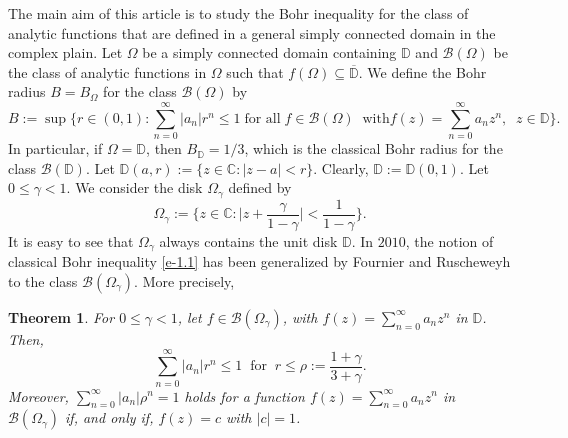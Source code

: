 \documentclass[a4paper,12pt]{amsart}
\theoremstyle{plain}
\newtheorem{thm}[equation]{Theorem}
\theoremstyle{definition}
\begin{document}
The main aim of this article is to study the Bohr inequality for the class of analytic functions that are defined in a general simply connected domain in the complex plain. Let $\Omega$ be a simply connected domain containing $\mathbb{D}$ and $\mathcal{B}(\Omega)$ be the class of analytic functions in $\Omega$ such that $f(\Omega) \subseteq \overline{\mathbb{D}}$. We define the Bohr radius $B=B_{\Omega}$ for the class $\mathcal{B}(\Omega)$ by 
\begin{equation*}
	B:=\sup\bigg\{r\in (0,1) : \sum_{n=0}^{\infty}|a_n|r^n\leq 1\; \text{for all}\; f\in\mathcal{B}(\Omega)\;\; \mbox{with} f(z)=\sum_{n=0}^{\infty}a_nz^n, \;\; z\in\mathbb{D}\bigg\}.
\end{equation*}
In particular, if $ \Omega=\mathbb{D} $, then $ B_{\mathbb{D}}=1/3 $, which is the classical Bohr radius for the class $\mathcal{B}(\mathbb{D})$. Let $\mathbb{D}(a,r):=\{z\in \mathbb{C}: |z-a|<r\}$. Clearly, $\mathbb{D}:=\mathbb{D}(0,1)$. Let $0\leq \gamma <1$. We consider the disk $\Omega _{\gamma}$ defined by 
$$
\Omega_{\gamma}:=\bigg\{z\in\mathbb{C} : \bigg|z+\frac{\gamma}{1-\gamma}\bigg|<\frac{1}{1-\gamma}\bigg\}.
$$
It is easy to see that $\Omega _{\gamma}$ always contains the unit disk $\mathbb{D}$.
In $ 2010 $, the notion of classical Bohr inequality \eqref{e-1.1} has been generalized by Fournier and Ruscheweyh \cite{Four-Rusc-2010} to the class $\mathcal{B}(\Omega_{\gamma})$. More precisely,
\begin{thm}\cite{Four-Rusc-2010} \label{thm-1.2}
	For $ 0\leq \gamma<1 $, let $ f\in\mathcal{B}(\Omega_{\gamma}) $, with $ f(z)=\sum_{n=0}^{\infty}a_nz^n $ in $ \mathbb{D} $. Then,
	\begin{equation*}
		\sum_{n=0}^{\infty}|a_n|r^n\leq 1\;\; \text{for}\;\; r\leq\rho:=\frac{1+\gamma}{3+\gamma}.
	\end{equation*}
Moreover, $ \sum_{n=0}^{\infty}|a_n|\rho^n=1 $ holds for a function $ f(z)=\sum_{n=0}^{\infty}a_nz^n $ in $ \mathcal{B}(\Omega_{\gamma}) $ if, and only if, $ f(z)=c $ with $ |c|=1 $.
\end{thm}
\end{document}
